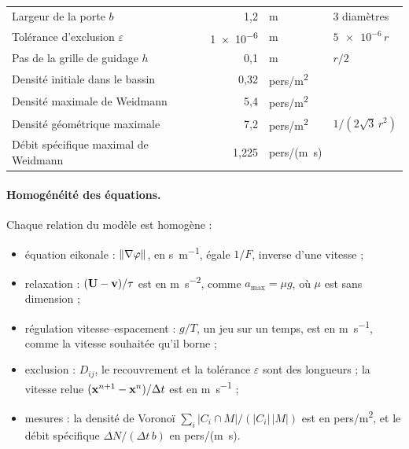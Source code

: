 \begin{table}[ht]
\begin{tabular}{p{5.4cm}rlp{4.4cm}}
Largeur de la porte $b$ & 1,2 & \si{\metre} & 3 diamètres \\
Tolérance d'exclusion $\varepsilon$ & \num{1e-6} & \si{\metre} & $\num{5e-6}\,r$ \\
Pas de la grille de guidage $h$ & 0,1 & \si{\metre} & $r/2$ \\
Densité initiale dans le bassin & 0,32 & pers/\si{\metre\squared} & \\
Densité maximale de Weidmann & 5,4 & pers/\si{\metre\squared} & \cite{weidmann1993} \\
Densité géométrique maximale & 7,2 & pers/\si{\metre\squared} & $1/(2\sqrt3\,r^2)$ \\
Débit spécifique maximal de Weidmann & 1,225 & pers/(\si{\metre\second}) & \cite{weidmann1993} \\
\bottomrule
\end{tabular}
\end{table}

\paragraph{Homogénéité des équations.}
Chaque relation du modèle est homogène :
\begin{itemize}
\item équation eikonale : $\left\lVert \nabla\varphi \right\rVert$, en \si{\second\per\metre}, égale
  $1/F$, inverse d'une vitesse ;
\item relaxation : $(\mathbf{U}-\mathbf{v})/\tau$ est en
  \si{\metre\per\second\squared}, comme $a_{\max}=\mu g$, où $\mu$ est sans
  dimension ;
\item régulation vitesse--espacement : $g/T$, un jeu sur un temps, est en
  \si{\metre\per\second}, comme la vitesse souhaitée qu'il borne ;
\item exclusion : $D_{ij}$, le recouvrement et la tolérance $\varepsilon$ sont
  des longueurs ; la vitesse relue $(\mathbf{x}^{n+1}-\mathbf{x}^n)/\Delta t$ est en
  \si{\metre\per\second} ;
\item mesures : la densité de Voronoï $\sum_i |C_i\cap M|/(|C_i|\,|M|)$ est en
  pers/\si{\metre\squared}, et le débit spécifique $\Delta N/(\Delta t\,b)$ en
  pers/(\si{\metre\second}).
\end{itemize}


